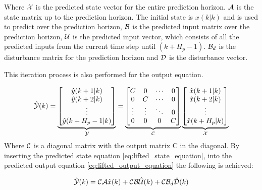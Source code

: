Where $\CMcal{X}$ is the predicted state vector for the entire prediction horizon. $\CMcal{A}$ is the state matrix up to the prediction horizon. The initial state is $x(k|k)$ and is used to predict over the prediction horizon, $\CMcal{B}$ is the predicted input matrix over the prediction horizon, $\CMcal{U}$ is the predicted input vector, which consists of all the predicted inputs from the current time step until $(k+H_p-1)$. $\CMcal{B}_d$ is the disturbance matrix for the prediction horizon and $\CMcal{D}$ is the disturbance vector. 

This iteration process is also performed for the output equation.

\begin{equation}\label{eq:lifted_output_equation}
	\hat{\CMcal{Y}}(k)= 
	\underbrace{\begin{bmatrix}
	\hat{y}(k+1|k)\\
	\hat{y}(k+2|k)\\
	\vdots\\
	\hat{y}(k+H_p-1|k)
	\end{bmatrix}}_{\CMcal{Y}}
	= 
	\underbrace{\begin{bmatrix}
	C 		& 0 	&\cdots	& 0\\
	0 		& C 	&\cdots & 0 \\
	\vdots	& \vdots&\ddots & 0\\
	0 		& 0		&0 		& C
	\end{bmatrix}}_{\CMcal{C}}
	  \underbrace{\begin{bmatrix}
	  \hat{x}(k+1|k) 	\\
	  \hat{x}(k+2|k) 	\\
	  \vdots 			\\
	  \hat{x}(k+H_p|k) 	\\
	   \end{bmatrix}}_{\CMcal{X}}
\end{equation}
Where $\CMcal{C}$ is a diagonal matrix with the output matrix C in the diagonal. By inserting the predicted state equation \ref{eq:lifted_state_equation}, into the predicted output equation \ref{eq:lifted_output_equation} the following is achieved:

\begin{equation}\label{eq:output_eq_with_state_eq}
	\hat{\CMcal{Y}}(k) =  \CMcal{C}\CMcal{A}\hat{x}(k) +  \CMcal{C}\CMcal{B}\hat{\CMcal{U}}(k) +\CMcal{C}\CMcal{B}_d\hat{\CMcal{D}}(k)
\end{equation}   

